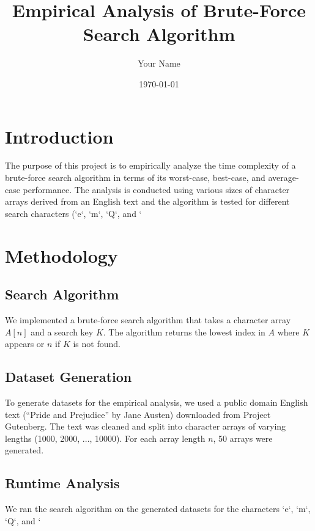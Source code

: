 \documentclass{article}
\title{Empirical Analysis of Brute-Force Search Algorithm}
\author{Your Name}
\date{\today}
\begin{document}
	
	\maketitle
	
	\tableofcontents
	
	\newpage
	
	\section{Introduction}
	The purpose of this project is to empirically analyze the time complexity of a brute-force search algorithm in terms of its worst-case, best-case, and average-case performance. The analysis is conducted using various sizes of character arrays derived from an English text and the algorithm is tested for different search characters (`e`, `m`, `Q`, and `%
	
	\section{Methodology}
	
	\subsection{Search Algorithm}
	We implemented a brute-force search algorithm that takes a character array \( A[n] \) and a search key \( K \). The algorithm returns the lowest index in \( A \) where \( K \) appears or \( n \) if \( K \) is not found. 
	
	\subsection{Dataset Generation}
	To generate datasets for the empirical analysis, we used a public domain English text (``Pride and Prejudice'' by Jane Austen) downloaded from Project Gutenberg. The text was cleaned and split into character arrays of varying lengths (1000, 2000, ..., 10000). For each array length \( n \), 50 arrays were generated.
	
	\subsection{Runtime Analysis}
	We ran the search algorithm on the generated datasets for the characters `e`, `m`, `Q`, and `%
	
\end{document}
